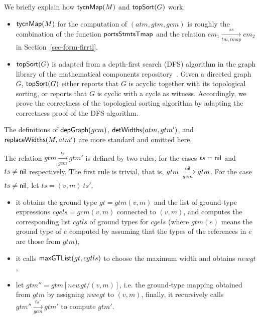 We briefly explain how   ${\sf tycnMap}(M)$ and ${\sf topSort}(G)$ work. 
\begin{itemize}
\item ${\sf tycnMap}(M)$ for the computation of $(atm, gtm, gcm)$ is roughly the combination of the function ${\sf portsStmtsTmap}$ and the relation $cm_1 \xrightarrow[tm, tmap]{ss} cm_2$ in Section~\ref{sec-form-firrtl}. 
%
% 
\item ${\sf topSort}(G)$ is adapted from a depth-first search (DFS) algorithm in the graph library of the mathematical components repository~\cite{DP20,CoqGraph}. Given a directed graph $G$, ${\sf topSort}(G)$ either reports that $G$ is acyclic together with its topological sorting, or reports that $G$ is cyclic with a cycle as witness. Accordingly, we prove the correctness of the topological sorting algorithm by adapting the correctness proof of the DFS algorithm. 
%
\end{itemize}
The definitions of ${\sf depGraph}(gcm)$, ${\sf detWidths}(atm, gtm')$, and ${\sf replaceWidths}(M, atm')$ are more standard and omitted here. 

The relation $gtm \xrightarrow[gcm]{ts} gtm'$ is defined by two rules,  for the cases $ts = {\sf nil}$ and $ts \neq {\sf nil}$ respectively. The first rule is trivial, that is, $gtm \xrightarrow[gcm]{{\sf nil}} gtm$. For the case $ts \neq {\sf nil}$, let $ts = (v, m)\ ts'$,   
\begin{itemize}
\item it obtains the ground type $gt = gtm(v, m)$ and the list of ground-type expressions $cgels = gcm(v, m)$ connected to $(v, m)$, and computes the corresponding list $cgtls$ of ground types for $cgels$ (where $gtm(e)$ means the ground type of $e$ computed by assuming that the types of the references in $e$ are those from $gtm$), 
\item it calls ${\sf maxGTList}(gt, cgtls)$ to choose the maximum width and obtains $newgt$, 
\item let $gtm'' = gtm[newgt/(v, m)]$, i.e. the ground-type mapping obtained from $gtm$ by assigning $nwegt$ to $(v, m)$, finally, it recursively calls $gtm'' \xrightarrow[gcm]{ts'} gtm'$ to compute $gtm'$. 
\end{itemize}
%

